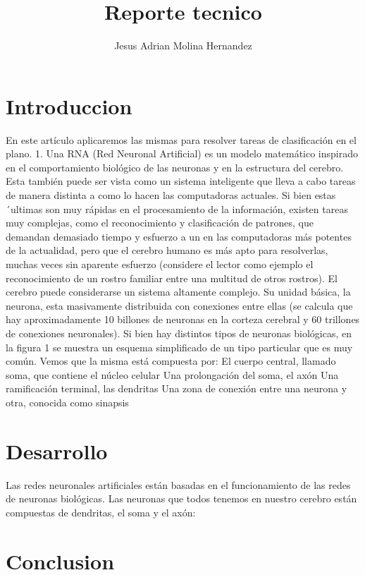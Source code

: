 \documentclass[10pt]{article}         %
\title{Reporte tecnico}
\author{Jesus Adrian Molina Hernandez}
\begin{document}
\maketitle


\section{Introduccion}

En este artículo aplicaremos las mismas para resolver tareas de clasificación en el plano. 1.
Una RNA (Red Neuronal Artificial) es un modelo matemático inspirado en el comportamiento
biológico de las neuronas y en la estructura del cerebro. Esta también puede ser vista como un
sistema inteligente que lleva a cabo tareas de manera distinta a como lo hacen las
computadoras actuales. Si bien estas ´ultimas son muy rápidas en el procesamiento de la
información, existen tareas muy complejas, como el reconocimiento y clasificación de
patrones, que demandan demasiado tiempo y esfuerzo a un en las computadoras más
potentes de la actualidad, pero que el cerebro humano es más apto para resolverlas, muchas
veces sin aparente esfuerzo (considere el lector como ejemplo el reconocimiento de un rostro
familiar entre una multitud de otros rostros). El cerebro puede considerarse un sistema
altamente complejo. Su unidad básica, la neurona, esta masivamente distribuida con
conexiones entre ellas (se calcula que hay aproximadamente 10 billones de neuronas en la
corteza cerebral y 60 trillones de conexiones neuronales).
Si bien hay distintos tipos de neuronas biológicas, en la figura 1 se muestra un esquema
simplificado de un tipo particular que es muy común. Vemos que la misma está compuesta
por:
El cuerpo central, llamado soma, que contiene el núcleo celular Una prolongación del soma, el
axón Una ramificación terminal, las dendritas Una zona de conexión entre una neurona y otra,
conocida como sinapsis

\section{Desarrollo}

Las redes neuronales artificiales están basadas en el funcionamiento de las redes de neuronas
biológicas. Las neuronas que todos tenemos en nuestro cerebro están compuestas de
dendritas, el soma y el axón:
\section{Conclusion}
\end{document}
